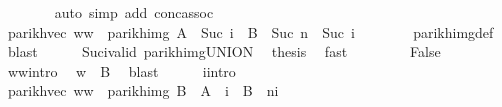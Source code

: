 \begin{isabellebody}
\ \ \ \ \ \ \isamarkupfalse%
\ {\isacharparenleft}{\kern0pt}auto\ simp\ add{\isacharcolon}{\kern0pt}\ conc{\isacharunderscore}{\kern0pt}assoc{\isacharparenright}{\kern0pt}\isanewline
\ \ \ \ \isamarkupfalse%
\ \isamarkupfalse%
\ {\isachardoublequoteopen}parikh{\isacharunderscore}{\kern0pt}vec\ {\isacharparenleft}{\kern0pt}w{}{\isacharat}{\kern0pt}w{}{\isacharprime}{\kern0pt}{\isacharparenright}{\kern0pt}\ {\isasymin}\ parikh{\isacharunderscore}{\kern0pt}img\ {\isacharparenleft}{\kern0pt}A\ {\isacharcircum}{\kern0pt}{\isacharcircum}{\kern0pt}\ {\isacharparenleft}{\kern0pt}Suc\ i{\isacharparenright}{\kern0pt}\ {\isacharat}{\kern0pt}{\isacharat}{\kern0pt}\ B\ {\isacharcircum}{\kern0pt}{\isacharcircum}{\kern0pt}\ {\isacharparenleft}{\kern0pt}Suc\ n\ {\isacharminus}{\kern0pt}\ Suc\ i{\isacharparenright}{\kern0pt}{\isacharparenright}{\kern0pt}{\isachardoublequoteclose}\isanewline
\ \ \ \ \ \ \isamarkupfalse%
\ parikh{\isacharunderscore}{\kern0pt}img{\isacharunderscore}{\kern0pt}def\ \isamarkupfalse%
\ blast\isanewline
\ \ \ \ \isamarkupfalse%
\ Suc{\isacharunderscore}{\kern0pt}i{\isacharunderscore}{\kern0pt}valid\ parikh{\isacharunderscore}{\kern0pt}img{\isacharunderscore}{\kern0pt}UNION\ \isamarkupfalse%
\ {\isacharquery}{\kern0pt}thesis\ \isamarkupfalse%
\ fast\isanewline
\ \ \isamarkupfalse%
\isanewline
\ \ \ \ \isamarkupfalse%
\ False\isanewline
\ \ \ \ \isamarkupfalse%
\ w{}{\isacharunderscore}{\kern0pt}w{}{\isacharunderscore}{\kern0pt}intro\ \isamarkupfalse%
\ {\isachardoublequoteopen}w{}\ {\isasymin}\ B{\isachardoublequoteclose}\ \isamarkupfalse%
\ blast\isanewline
\ \ \ \ \isamarkupfalse%
\ i{\isacharunderscore}{\kern0pt}intro\ \isamarkupfalse%
\ {\isachardoublequoteopen}parikh{\isacharunderscore}{\kern0pt}vec\ {\isacharparenleft}{\kern0pt}w{}{\isacharat}{\kern0pt}w{}{\isacharprime}{\kern0pt}{\isacharparenright}{\kern0pt}\ {\isasymin}\ parikh{\isacharunderscore}{\kern0pt}img\ {\isacharparenleft}{\kern0pt}B\ {\isacharat}{\kern0pt}{\isacharat}{\kern0pt}\ A\ {\isacharcircum}{\kern0pt}{\isacharcircum}{\kern0pt}\ i\ {\isacharat}{\kern0pt}{\isacharat}{\kern0pt}\ B\ {\isacharcircum}{\kern0pt}{\isacharcircum}{\kern0pt}\ {\isacharparenleft}{\kern0pt}n{\isacharminus}{\kern0pt}i{\isacharparenright}{\kern0pt}{\isacharparenright}{\kern0pt}{\isachardoublequoteclose}\isanewline

\end{isabellebody}
